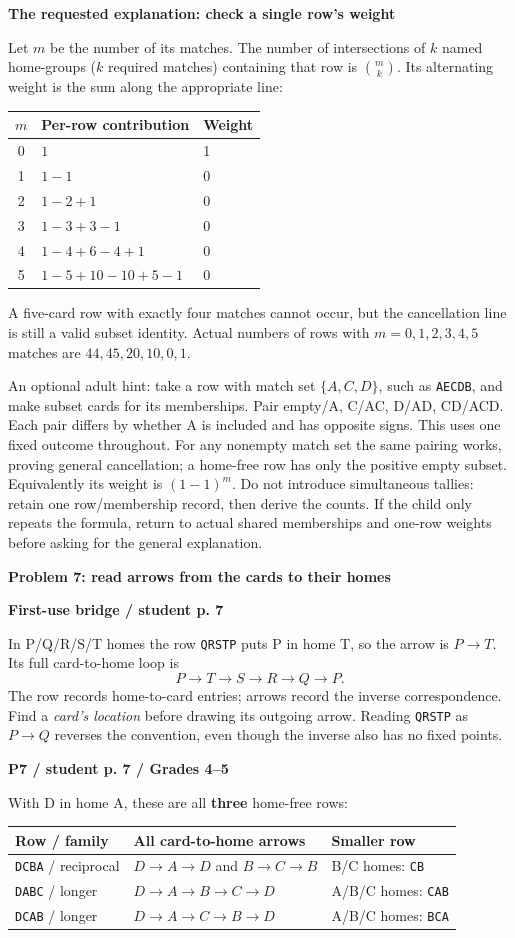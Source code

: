 \documentclass[11pt]{article}
\newcommand{\heading}[1]{\par\textbf{\large #1}\par}
\newcommand{\subhead}[1]{\par\textbf{#1}\par}
\newcommand{\row}[1]{\texttt{#1}}
\newcommand{\guidepage}{\newpage}
\begin{document}
\subhead{The requested explanation: check a single row's weight}
Let $m$ be the number of its matches. The number of intersections of $k$ named home-groups ($k$ required matches) containing that row is $\binom mk$. Its alternating weight is the sum along the appropriate line:
\begin{center}\begin{tabular}{@{}cll@{}}\toprule
$m$ & Per-row contribution & Weight\\\midrule
0 & $1$ &1\\
1 & $1-1$ &0\\
2 & $1-2+1$ &0\\
3 & $1-3+3-1$ &0\\
4 & $1-4+6-4+1$ &0\\
5 & $1-5+10-10+5-1$ &0\\\bottomrule
\end{tabular}\end{center}
A five-card row with exactly four matches cannot occur, but the cancellation line is still a valid subset identity. Actual numbers of rows with $m=0,1,2,3,4,5$ matches are $44,45,20,10,0,1$.

An optional adult hint: take a row with match set $\{A,C,D\}$, such as \row{AECDB}, and make subset cards for its memberships. Pair empty/A, C/AC, D/AD, CD/ACD. Each pair differs by whether A is included and has opposite signs. This uses one fixed outcome throughout. For any nonempty match set the same pairing works, proving general cancellation; a home-free row has only the positive empty subset. Equivalently its weight is $(1-1)^m$. Do not introduce simultaneous tallies: retain one row/membership record, then derive the counts. If the child only repeats the formula, return to actual shared memberships and one-row weights before asking for the general explanation.

\guidepage
\heading{Problem 7: read arrows from the cards to their homes}

\subhead{First-use bridge / student p. 7}
In P/Q/R/S/T homes the row \row{QRSTP} puts P in home T, so the arrow is $P\to T$. Its full card-to-home loop is
\[
 P\to T\to S\to R\to Q\to P.
\]
The row records home-to-card entries; arrows record the inverse correspondence. Find a \emph{card's location} before drawing its outgoing arrow. Reading \row{QRSTP} as $P\to Q$ reverses the convention, even though the inverse also has no fixed points.

\subhead{P7 / student p. 7 / Grades 4--5}
With D in home A, these are all \textbf{three} home-free rows:
\begin{center}\begin{tabularx}{\linewidth}{@{}lXp{32mm}@{}}\toprule
Row / family & All card-to-home arrows & Smaller row\\\midrule
\row{DCBA} / reciprocal & $D\to A\to D$ and $B\to C\to B$ & B/C homes: \row{CB}\\
\row{DABC} / longer & $D\to A\to B\to C\to D$ & A/B/C homes: \row{CAB}\\
\row{DCAB} / longer & $D\to A\to C\to B\to D$ & A/B/C homes: \row{BCA}\\\bottomrule
\end{tabularx}\end{center}
\end{document}
